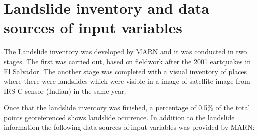 \documentclass[11pt,twoside]{rmta2010esp}%
\begin{document}
\section{Landslide inventory and data sources of input variables}
\label{sec:landsinvet}
The Landslide inventory was developed by MARN and it was conducted in two stages. The first was carried out, based on fieldwork after the 2001 eartquakes in El Salvador. The another stage was completed with a visual inventory of places where there were landslides which were visible in a image of satellite image from IRS-C sensor (Indian) in the same year.











Once that the landslide inventory was finished, a percentage of 0.5\% of the total points georeferenced shows landslide ocurrence. In addition to the landslide information the following data sources of input variables was provided by MARN: 
\end{document}
